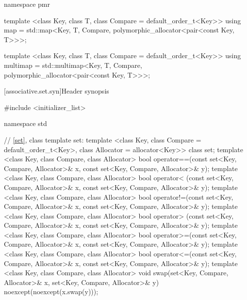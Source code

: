 \begin{codeblock}
{  namespace pmr {
    template <class Key, class T, class Compare = default_order_t<Key>>
      using map = std::map<Key, T, Compare,
                           polymorphic_allocator<pair<const Key, T>>>;

    template <class Key, class T, class Compare = default_order_t<Key>>
      using multimap = std::multimap<Key, T, Compare,
                                     polymorphic_allocator<pair<const Key, T>>>;
  }
}
\end{codeblock}

[associative.set.syn]{Header  synopsis}%

\begin{codeblock}
#include <initializer_list>

namespace std {
  // \ref{set}, class template set:
  template <class Key, class Compare = default_order_t<Key>,
            class Allocator = allocator<Key>>
    class set;
  template <class Key, class Compare, class Allocator>
    bool operator==(const set<Key, Compare, Allocator>& x,
                    const set<Key, Compare, Allocator>& y);
  template <class Key, class Compare, class Allocator>
    bool operator< (const set<Key, Compare, Allocator>& x,
                    const set<Key, Compare, Allocator>& y);
  template <class Key, class Compare, class Allocator>
    bool operator!=(const set<Key, Compare, Allocator>& x,
                    const set<Key, Compare, Allocator>& y);
  template <class Key, class Compare, class Allocator>
    bool operator> (const set<Key, Compare, Allocator>& x,
                    const set<Key, Compare, Allocator>& y);
  template <class Key, class Compare, class Allocator>
    bool operator>=(const set<Key, Compare, Allocator>& x,
                    const set<Key, Compare, Allocator>& y);
  template <class Key, class Compare, class Allocator>
    bool operator<=(const set<Key, Compare, Allocator>& x,
                    const set<Key, Compare, Allocator>& y);
  template <class Key, class Compare, class Allocator>
    void swap(set<Key, Compare, Allocator>& x,
              set<Key, Compare, Allocator>& y)
      noexcept(noexcept(x.swap(y)));

}
\end{codeblock}
